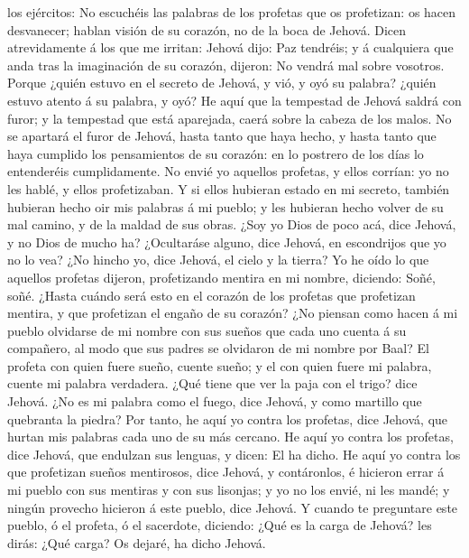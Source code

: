 los ejércitos: No escuchéis las palabras de los profetas que os
profetizan: os hacen desvanecer; hablan visión de su corazón, no de la
boca de Jehová.  Dicen atrevidamente á los que me irritan:
Jehová dijo: Paz tendréis; y á cualquiera que anda tras la imaginación
de su corazón, dijeron: No vendrá mal sobre vosotros. 
Porque ¿quién estuvo en el secreto de Jehová, y vió, y oyó su palabra?
¿quién estuvo atento á su palabra, y oyó?  He aquí que la
tempestad de Jehová saldrá con furor; y la tempestad que está aparejada,
caerá sobre la cabeza de los malos.  No se apartará el
furor de Jehová, hasta tanto que haya hecho, y hasta tanto que haya
cumplido los pensamientos de su corazón: en lo postrero de los días lo
entenderéis cumplidamente.  No envié yo aquellos profetas,
y ellos corrían: yo no les hablé, y ellos profetizaban.  Y
si ellos hubieran estado en mi secreto, también hubieran hecho oir mis
palabras á mi pueblo; y les hubieran hecho volver de su mal camino, y de
la maldad de sus obras.  ¿Soy yo Dios de poco acá, dice
Jehová, y no Dios de mucho ha?  ¿Ocultaráse alguno, dice
Jehová, en escondrijos que yo no lo vea? ¿No hincho yo, dice Jehová, el
cielo y la tierra?  Yo he oído lo que aquellos profetas
dijeron, profetizando mentira en mi nombre, diciendo: Soñé, soñé.
 ¿Hasta cuándo será esto en el corazón de los profetas que
profetizan mentira, y que profetizan el engaño de su corazón?
 ¿No piensan como hacen á mi pueblo olvidarse de mi nombre
con sus sueños que cada uno cuenta á su compañero, al modo que sus
padres se olvidaron de mi nombre por Baal?  El profeta con
quien fuere sueño, cuente sueño; y el con quien fuere mi palabra, cuente
mi palabra verdadera. ¿Qué tiene que ver la paja con el trigo? dice
Jehová.  ¿No es mi palabra como el fuego, dice Jehová, y
como martillo que quebranta la piedra?  Por tanto, he aquí
yo contra los profetas, dice Jehová, que hurtan mis palabras cada uno de
su más cercano.  He aquí yo contra los profetas, dice
Jehová, que endulzan sus lenguas, y dicen: El ha dicho.  He
aquí yo contra los que profetizan sueños mentirosos, dice Jehová, y
contáronlos, é hicieron errar á mi pueblo con sus mentiras y con sus
lisonjas; y yo no los envié, ni les mandé; y ningún provecho hicieron á
este pueblo, dice Jehová.  Y cuando te preguntare este
pueblo, ó el profeta, ó el sacerdote, diciendo: ¿Qué es la carga de
Jehová? les dirás: ¿Qué carga? Os dejaré, ha dicho Jehová. 
